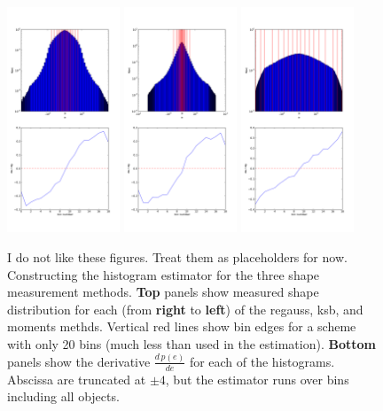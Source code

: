 \documentclass[iop]{emulateapj}
\begin{document}
\begin{figure}
\includegraphics[width=0.3\textwidth]{./Plots/regauss-opt-shear_plots-prior_derivs.png}
\includegraphics[width=0.3\textwidth]{./Plots/ksb-opt-shear_plots-prior_derivs.png}
\includegraphics[width=0.3\textwidth]{./Plots/moments-opt-shear_plots-prior_derivs.png}
\caption{I do not like these figures. Treat them as placeholders for now.\\
Constructing the histogram estimator for the three shape measurement methods. {\bf Top} panels show measured shape distribution for each (from {\bf right} to {\bf left}) of the regauss, ksb, and moments methds. Vertical red lines show bin edges for a scheme with only 20 bins (much less than used in the estimation). {\bf Bottom} panels show the derivative $\frac{d\,p(e)}{d{e}}$ for each of the histograms. Abscissa are truncated at $\pm 4$, but the estimator runs over bins including all objects.
}
\label{fig:estimator}
\end{figure}
\end{document}
